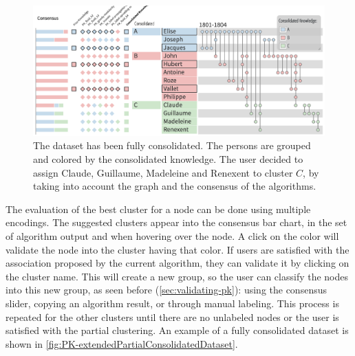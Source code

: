 \begin{figure}
\centering
\includegraphics[width=\linewidth]{static/figures/PK-Clustering/VISPaperFigures/Small-FinalPartition.png}
\caption{The dataset has been fully consolidated. The persons are grouped and colored by the consolidated knowledge. The user decided to assign Claude, Guillaume, Madeleine and Renexent to cluster $C$, by taking into account the graph and the consensus of the algorithms.}
\label{fig:PK-extendedPartialConsolidatedDataset}
\end{figure}


The evaluation of the best cluster for a node can be done using multiple encodings.
The suggested clusters appear into the consensus bar chart, in the set of algorithm output and when hovering over the node. A click on the color will validate the node into the cluster having that color.
If users are satisfied with the association proposed by the current algorithm, they can validate it by clicking on the cluster name. This will create a new group, so the user can classify the nodes into this new group, as seen before (\autoref{sec:validating-pk}): using the consensus slider, copying an algorithm result, or through manual labeling.
This process is repeated for the other clusters until there are no unlabeled nodes or the user is satisfied with the partial clustering. An example of a fully consolidated dataset is shown in \autoref{fig:PK-extendedPartialConsolidatedDataset}.

